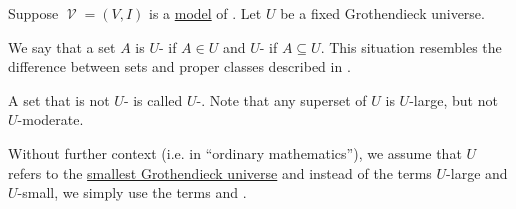 \begin{definition}\label{def:large_and_small_sets}
  Suppose \( \mscrV = (V, I) \) is a \hyperref[def:first_order_semantics/satisfiability]{model} of . Let \( U \) be a fixed Grothendieck universe.

  We say that a set \( A \) is \( U \)- if \( A \in U \) and \( U \)- if \( A \subseteq U \). This situation resembles the difference between sets and proper classes described in .

  A set that is not \( U \)- is called \( U \)-. Note that any superset of \( U \) is \( U \)-large, but not \( U \)-moderate.

  Without further context (i.e. in \enquote{ordinary mathematics}), we assume that \( U \) refers to the \hyperref[thm:smallest_grothendieck_universe_existence]{smallest Grothendieck universe} and instead of the terms \( U \)-large and \( U \)-small, we simply use the terms  and .
\end{definition}


